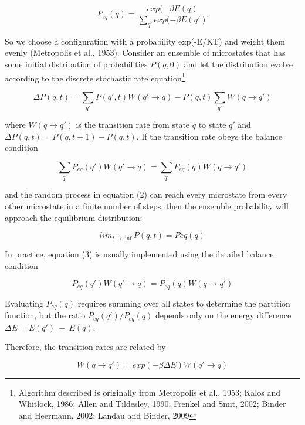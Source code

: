 \documentclass[5p,authoryear]{elsarticle}
\begin{document}
\begin{equation}
  P_{eq}(q) = \frac{exp(-\beta E(q)}{\sum_{q'} exp(-\beta E(q')}
\end{equation}

So we choose a configuration with a probability exp(-E/KT) and weight them evenly (Metropolis et al., 1953). Consider an ensemble of microstates that has some initial distribution of probabilities $P(q,0)$ and let the distribution evolve according to the discrete stochastic rate equation\footnote{Algorithm described is originally from Metropolis et al., 1953; Kalos and Whitlock, 1986; Allen and Tildesley, 1990; Frenkel and Smit, 2002; Binder and Heermann, 2002; Landau and Binder, 2009}

\begin{equation}
  \Delta P(q,t) = \sum_{q'}P(q',t)W(q' \rightarrow q) - P(q,t)\sum_{q'}W(q \rightarrow q')
\end{equation}

where $W(q \rightarrow q')$ is the transition rate from state $q$ to state $q'$ and $\Delta P(q,t) = P(q,t+1) - P(q,t)$. If the transition rate obeys the balance condition

\begin{equation}
  \sum_{q'}P_{eq}(q')W(q' \rightarrow q) = \sum_{q'}P_{eq}(q)W(q \rightarrow q')
\end{equation}

and the random process in equation (2) can reach every microstate from every other microstate in a finite number of steps, then the ensemble probability will approach the equilibrium distribution:

\begin{equation}
  lim_{t \rightarrow \inf} P(q,t) = Peq(q)
\end{equation}

In practice, equation (3) is usually implemented using the detailed balance condition

\begin{equation}
  P_{eq}(q')W(q' \rightarrow q) = P_{eq}(q)W(q \rightarrow q')
\end{equation}

Evaluating $P_{eq}(q)$ requires summing over all states to determine the partition function, but the ratio $P_{eq}(q')/P_{eq}(q)$ depends only on the energy difference $\Delta E = E(q') \ - \ E(q)$.

Therefore, the transition rates are related by

\begin{equation}
  W(q \rightarrow q') = exp(-\beta \Delta E)W(q' \rightarrow q)
\end{equation}
\end{document}
